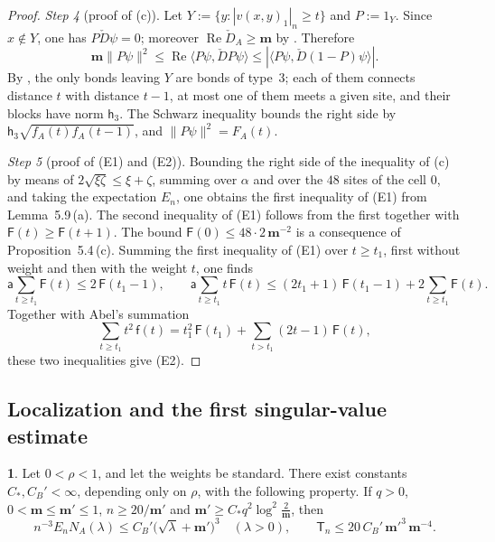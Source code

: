 \documentclass[11pt]{amsart}
\newcommand{\namedhead}{}
\theoremstyle{definition}
\newtheorem*{namedinner}{\namedhead}
\newenvironment{named}[1]{\renewcommand{\namedhead}{#1}\begin{namedinner}}{\end{namedinner}}
\begin{document}
\begin{proof}
\emph{Step 4} (proof of (c)).
Let $Y:=\{y:|v(x,y)_1|_n\ge t\}$ and $P:=1_Y$.
Since $x\notin Y$, one has $P\check D\psi=0$; moreover $\operatorname{Re}\check D_A\ge\mathbf m$ by \cite[Proposition~3.18\,(b), (d)]{QEDII}.
Therefore
\begin{equation*}
\mathbf m\|P\psi\|^2\le\operatorname{Re}\langle P\psi,\check DP\psi\rangle\le|\langle P\psi,\check D(1-P)\psi\rangle|.
\end{equation*}
By \cite[Proposition~3.6\,(c), (d)]{QEDII}, the only bonds leaving $Y$ are bonds of type~$3$; each of them connects distance $t$ with distance $t-1$, at most one of them meets a given site, and their blocks have norm $\mathsf h_3$.
The Schwarz inequality bounds the right side by $\mathsf h_3\sqrt{f_A(t)f_A(t-1)}$, and $\|P\psi\|^2=F_A(t)$.

\emph{Step 5} (proof of (E1) and (E2)).
Bounding the right side of the inequality of (c) by means of $2\sqrt{\xi\zeta}\le\xi+\zeta$, summing over $\alpha$ and over the $48$ sites of the cell $0$, and taking the expectation $E_n$, one obtains the first inequality of (E1) from Lemma~5.9\,(a).
The second inequality of (E1) follows from the first together with $\mathsf F(t)\ge\mathsf F(t+1)$.
The bound $\mathsf F(0)\le48\cdot2\,\mathbf m^{-2}$ is a consequence of Proposition~5.4\,(c).
Summing the first inequality of (E1) over $t\ge t_1$, first without weight and then with the weight $t$, one finds
\begin{equation*}
\mathsf a\sum_{t\ge t_1}\mathsf F(t)\le2\,\mathsf F(t_1-1),\qquad\mathsf a\sum_{t\ge t_1}t\,\mathsf F(t)\le(2t_1+1)\,\mathsf F(t_1-1)+2\sum_{t\ge t_1}\mathsf F(t).
\end{equation*}
Together with Abel's summation
\begin{equation*}
\sum_{t\ge t_1}t^2\,\mathsf f(t)=t_1^2\,\mathsf F(t_1)+\sum_{t>t_1}(2t-1)\,\mathsf F(t),
\end{equation*}
these two inequalities give (E2).
\end{proof}

\subsection{Localization and the first singular-value estimate}
\begin{named}{Proposition 5.11}
Let $0<\rho<1$, and let the weights be standard.
There exist constants $C_*,C_B'<\infty$, depending only on $\rho$, with the following property.
If $q>0$, $0<\mathbf m\le\mathbf m'\le1$, $n\ge20/\mathbf m'$ and $\mathbf m'\ge C_*q^2\log^2\frac2{\mathbf m}$, then
\begin{equation*}
n^{-3}E_nN_A(\lambda)\le C_B'\bigl(\sqrt\lambda+\mathbf m'\bigr)^3\quad(\lambda>0),\qquad\mathsf T_n\le20\,C_B'\,\mathbf m'^3\,\mathbf m^{-4}.
\end{equation*}
\end{named}
\end{document}
